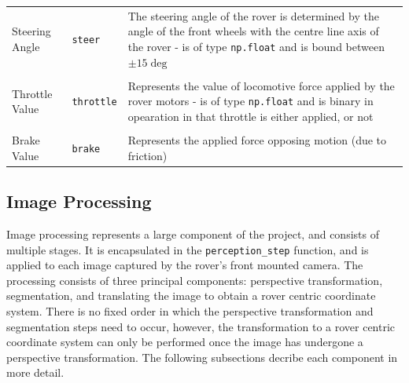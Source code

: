 \documentclass[a4paper]{article}
\begin{document}
\begin{table}[h]
\begin{tabular}{llp{10cm}}
Steering Angle & \verb|steer| & The steering angle of the rover is determined by the angle of the front wheels with the centre line axis of the rover - is of type \verb|np.float| and is bound between $\pm 15 \si{\deg}$\\
 & & \\
Throttle Value & \verb|throttle| & Represents the value of locomotive force applied by the rover motors - is of type \verb|np.float| and is binary in opearation in that throttle is either applied, or not\\
 & & \\
Brake Value & \verb|brake| & Represents the applied force opposing motion (due to friction)\\
\bottomrule
\end{tabular}
\end{table}
\newpage
\subsection{Image Processing}
Image processing represents a large component of the project, and consists of multiple stages. It is encapsulated in the \verb|perception_step| function, and is applied to each image captured by the rover's front mounted camera. The processing consists of three principal components: perspective transformation, segmentation, and translating the image to obtain a rover centric coordinate system. There is no fixed order in which the perspective transformation and segmentation steps need to occur, however, the transformation to a rover centric coordinate system can only be performed once the image has undergone a perspective transformation. The following subsections decribe each component in more detail.

\end{document}
